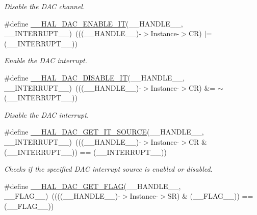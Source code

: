 \begin{DoxyCompactItemize}
\begin{DoxyCompactList}\small\item\em Disable the D\+AC channel. \end{DoxyCompactList}\item 
\#define \mbox{\hyperlink{group___d_a_c___exported___macros_gad2d1faa12c460680d8c9f16f7109fb28}{\+\_\+\+\_\+\+H\+A\+L\+\_\+\+D\+A\+C\+\_\+\+E\+N\+A\+B\+L\+E\+\_\+\+IT}}(\+\_\+\+\_\+\+H\+A\+N\+D\+L\+E\+\_\+\+\_\+,  \+\_\+\+\_\+\+I\+N\+T\+E\+R\+R\+U\+P\+T\+\_\+\+\_\+)~(((\+\_\+\+\_\+\+H\+A\+N\+D\+L\+E\+\_\+\+\_\+)-\/$>$Instance-\/$>$CR) $\vert$= (\+\_\+\+\_\+\+I\+N\+T\+E\+R\+R\+U\+P\+T\+\_\+\+\_\+))
\begin{DoxyCompactList}\small\item\em Enable the D\+AC interrupt. \end{DoxyCompactList}\item 
\#define \mbox{\hyperlink{group___d_a_c___exported___macros_ga6d5ee5415ca4fd7bf0087d8d3346b30b}{\+\_\+\+\_\+\+H\+A\+L\+\_\+\+D\+A\+C\+\_\+\+D\+I\+S\+A\+B\+L\+E\+\_\+\+IT}}(\+\_\+\+\_\+\+H\+A\+N\+D\+L\+E\+\_\+\+\_\+,  \+\_\+\+\_\+\+I\+N\+T\+E\+R\+R\+U\+P\+T\+\_\+\+\_\+)~(((\+\_\+\+\_\+\+H\+A\+N\+D\+L\+E\+\_\+\+\_\+)-\/$>$Instance-\/$>$CR) \&= $\sim$(\+\_\+\+\_\+\+I\+N\+T\+E\+R\+R\+U\+P\+T\+\_\+\+\_\+))
\begin{DoxyCompactList}\small\item\em Disable the D\+AC interrupt. \end{DoxyCompactList}\item 
\#define \mbox{\hyperlink{group___d_a_c___exported___macros_gaa1445e6fd0871e128a57dd01aa09660c}{\+\_\+\+\_\+\+H\+A\+L\+\_\+\+D\+A\+C\+\_\+\+G\+E\+T\+\_\+\+I\+T\+\_\+\+S\+O\+U\+R\+CE}}(\+\_\+\+\_\+\+H\+A\+N\+D\+L\+E\+\_\+\+\_\+,  \+\_\+\+\_\+\+I\+N\+T\+E\+R\+R\+U\+P\+T\+\_\+\+\_\+)~(((\+\_\+\+\_\+\+H\+A\+N\+D\+L\+E\+\_\+\+\_\+)-\/$>$Instance-\/$>$CR \& (\+\_\+\+\_\+\+I\+N\+T\+E\+R\+R\+U\+P\+T\+\_\+\+\_\+)) == (\+\_\+\+\_\+\+I\+N\+T\+E\+R\+R\+U\+P\+T\+\_\+\+\_\+))
\begin{DoxyCompactList}\small\item\em Checks if the specified D\+AC interrupt source is enabled or disabled. \end{DoxyCompactList}\item 
\#define \mbox{\hyperlink{group___d_a_c___exported___macros_gae6aa1f116cfc0caef56192a83f51bf78}{\+\_\+\+\_\+\+H\+A\+L\+\_\+\+D\+A\+C\+\_\+\+G\+E\+T\+\_\+\+F\+L\+AG}}(\+\_\+\+\_\+\+H\+A\+N\+D\+L\+E\+\_\+\+\_\+,  \+\_\+\+\_\+\+F\+L\+A\+G\+\_\+\+\_\+)~((((\+\_\+\+\_\+\+H\+A\+N\+D\+L\+E\+\_\+\+\_\+)-\/$>$Instance-\/$>$SR) \& (\+\_\+\+\_\+\+F\+L\+A\+G\+\_\+\+\_\+)) == (\+\_\+\+\_\+\+F\+L\+A\+G\+\_\+\+\_\+))

\end{DoxyCompactItemize}
